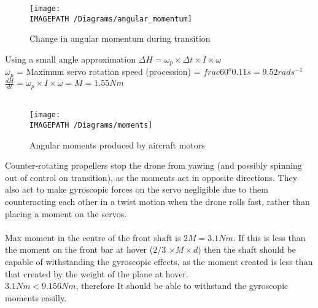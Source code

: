 \begin{figure}[!h]
	\centering
	\texttt{[image: \\IMAGEPATH /Diagrams/angular\_momentum]}
	\caption{Change in angular momentum during transition}
	\label{fig:momentum}
\end{figure}

Using a small angle approximation $\Delta H = \omega_p \times\Delta t \times I \times \omega$\\ 
$\omega_p$ = Maximum servo rotation speed (procession) = $frac{60^o}{0.11s} = 9.52rads^{-1}$\\
$\frac{dH}{dt} = \omega_p \times I \times \omega = M = 1.55Nm$\\\\

\begin{figure}[!h]
	\centering
	\texttt{[image: \\IMAGEPATH /Diagrams/moments]}
	\caption{Angular moments produced by aircraft motors}
	\label{fig:moments}
\end{figure}

 Counter-rotating propellers stop the drone from yawing (and possibly spinning out of control on transition), as the moments act in opposite directions. They also act to make gyroscopic forces on the servo negligible due to them counteracting each other in a twist motion when the drone rolls fast, rather than placing a moment on the servos.\\\\
Max moment in the centre of the front shaft is $2M = 3.1Nm$. If this is less than the moment on the front bar at hover ($2/3$ $\times M \times d$) then the shaft should be capable of withstanding the gyroscopic effects, as the moment created is less than that created by the weight of the plane at hover.\\

$3.1Nm < 9.156Nm$, therefore It should be able to withstand the gyroscopic moments easilly.

